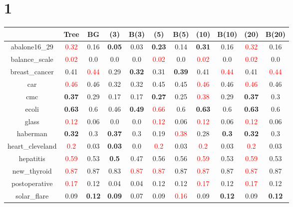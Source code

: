 \documentclass{article}%
\begin{document}
\section*{1}%
\begin{tabular}{c|cccccccccc}%
\hline%
&Tree&BG&(3)&B(3)&(5)&B(5)&(10)&B(10)&(20)&B(20)\\%
\hline%
abalone16\_29&\textcolor{red}{ 
0.32
}&0.16&\textbf{0.05}&0.03&\textbf{0.23}&0.14&\textbf{0.31}&0.16&\textcolor{red}{ 
0.32
}&0.16\\%
\hline%
balance\_scale&\textcolor{red}{ 
0.02
}&0.0&0.0&0.0&\textcolor{red}{ 
0.02
}&0.0&\textcolor{red}{ 
0.02
}&0.0&\textcolor{red}{ 
0.02
}&0.0\\%
\hline%
breast\_cancer&0.41&\textcolor{red}{ 
0.44
}&0.29&\textbf{0.32}&0.31&\textbf{0.39}&0.41&\textcolor{red}{ 
0.44
}&0.41&\textcolor{red}{ 
0.44
}\\%
\hline%
car&\textcolor{red}{ 
0.46
}&0.46&0.32&0.32&0.45&0.45&\textcolor{red}{ 
0.46
}&0.46&\textcolor{red}{ 
0.46
}&0.46\\%
\hline%
cmc&\textbf{0.37}&0.29&0.17&0.17&\textbf{0.27}&0.25&\textcolor{red}{ 
0.38
}&0.29&\textbf{0.37}&0.3\\%
\hline%
ecoli&\textbf{0.63}&0.6&0.46&\textbf{0.49}&\textcolor{red}{ 
0.66
}&0.6&\textbf{0.63}&0.6&\textbf{0.63}&0.6\\%
\hline%
glass&\textcolor{red}{ 
0.12
}&0.06&0.0&0.0&\textcolor{red}{ 
0.12
}&0.06&\textcolor{red}{ 
0.12
}&0.06&\textcolor{red}{ 
0.12
}&0.06\\%
\hline%
haberman&\textbf{0.32}&0.3&\textbf{0.37}&0.3&0.19&\textcolor{red}{ 
0.38
}&0.28&\textbf{0.3}&\textbf{0.32}&0.3\\%
\hline%
heart\_cleveland&\textcolor{red}{ 
0.2
}&0.03&\textbf{0.03}&0.0&\textcolor{red}{ 
0.2
}&0.03&\textcolor{red}{ 
0.2
}&0.03&\textcolor{red}{ 
0.2
}&0.03\\%
\hline%
hepatitis&\textcolor{red}{ 
0.59
}&0.53&\textbf{0.5}&0.47&0.56&0.56&\textcolor{red}{ 
0.59
}&0.53&\textcolor{red}{ 
0.59
}&0.53\\%
\hline%
new\_thyroid&\textcolor{red}{ 
0.87
}&0.87&0.83&\textcolor{red}{ 
0.87
}&\textcolor{red}{ 
0.87
}&0.87&\textcolor{red}{ 
0.87
}&0.87&\textcolor{red}{ 
0.87
}&0.87\\%
\hline%
postoperative&\textcolor{red}{ 
0.17
}&0.12&0.04&0.04&0.12&0.12&\textcolor{red}{ 
0.17
}&0.12&\textcolor{red}{ 
0.17
}&0.12\\%
\hline%
solar\_flare&0.09&\textbf{0.12}&\textbf{0.09}&0.07&0.09&\textcolor{red}{ 
0.16
}&0.09&\textbf{0.12}&0.09&\textbf{0.12}\\%

\end{tabular}
\end{document}
